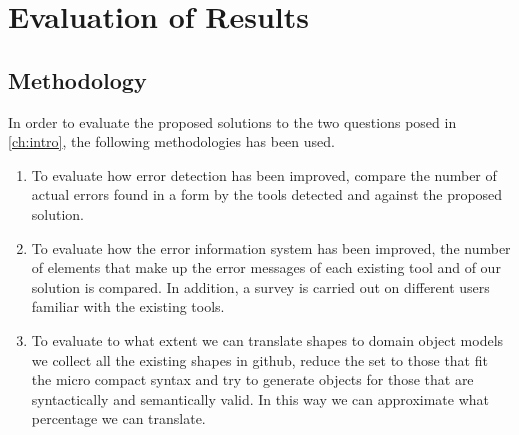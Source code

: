 \chapter{Evaluation of Results}
\label{ch:results-evaluation}

\section{Methodology}
In order to evaluate the proposed solutions to the two questions posed in \cref{ch:intro},
the following methodologies has been used.

\begin{enumerate}
    \item To evaluate how error detection has been improved, compare the number of actual errors found
    in a form by the tools detected and against the proposed solution.
    
    \item To evaluate how the error information system has been improved, the number of elements that
    make up the error messages of each existing tool and of our solution is compared. In addition,
    a survey is carried out on different users familiar with the existing tools.

    \item To evaluate to what extent we can translate shapes to domain object models we collect all the
    existing shapes in github, reduce the set to those that fit the micro compact syntax and try to
    generate objects for those that are syntactically and semantically valid. In this way we can
    approximate what percentage we can translate.
\end{enumerate}